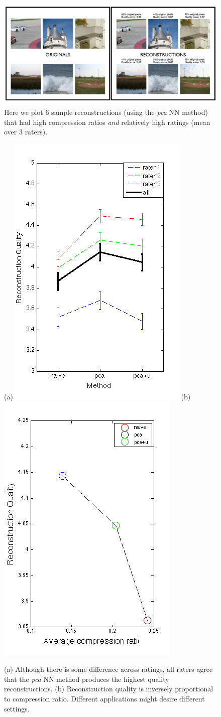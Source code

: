  \begin{figure}
\includegraphics[width=1\linewidth]{fig_quality/orig_recon.pdf}
\caption{Here we plot 6 sample reconstructions (using the \emph{pca} NN method) that had high compression ratios \emph{and} relatively high ratings (mean over 3 raters). }
\label{fig:recon}
\end{figure}

 \begin{figure}
\centering
(a)\includegraphics[width=0.3\linewidth]{fig_quality/quality_by_method.png}
(b)\includegraphics[width=0.3\linewidth]{fig_quality/qual_compr.png}
\caption{(a) Although there is some difference across ratings, all raters agree that the \emph{pca} NN method produces the highest quality reconstructions. (b) Reconstruction quality is inversely proportional to compression ratio. Different applications might desire different settings.}
\label{fig:qual_method}
\end{figure}
